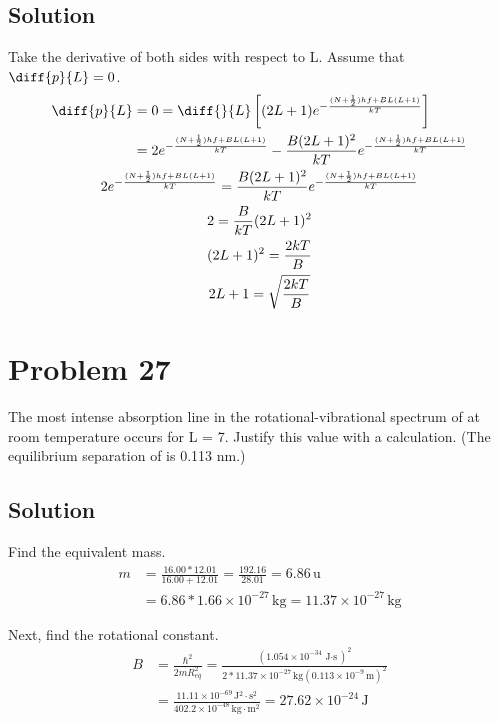 \documentclass[12pt]{report}
\newcommand{\e}[1]{e^{#1}}
\newcommand{\E}[1]{\times 10^{#1}}
\begin{document}
    \subsection{Solution}
        Take the derivative of both sides with respect to L.
        Assume that $\diff{p}{L} = 0$.
        \begin{gather}
            \begin{align}
                \diff{p}{L} &=  0
                    =   \diff{}{L}\left[ (2L + 1) \e{-\frac{(N + \frac{1}{2})hf + BL(L + 1)}{kT}}\right]\\
                    &=  2\e{-\frac{(N + \frac{1}{2})hf + BL(L + 1)}{kT}} - \frac{B(2L + 1)^2}{kT}\e{-\frac{(N + \frac{1}{2})hf + BL(L + 1)}{kT}}
            \end{align}\\
            2\e{-\frac{(N + \frac{1}{2})hf + BL(L + 1)}{kT}} = \frac{B(2L + 1)^2}{kT}\e{-\frac{(N + \frac{1}{2})hf + BL(L + 1)}{kT}}\\
            2 = \frac{B}{kT}(2L + 1)^2\\
            (2L+1)^2 = \frac{2kT}{B}\\
            2L + 1 = \sqrt{\frac{2kT}{B}}
        \end{gather}
    \pagebreak

\section{Problem 27}
    The most intense absorption line in the rotational-vibrational spectrum of  at room temperature occurs for L = 7. 
    Justify this value with a calculation. 
    (The equilibrium separation of  is 0.113 nm.)

    \subsection{Solution}
        Find the equivalent mass.
        \begin{align}
            m   &=  \frac{16.00 * 12.01}{16.00 + 12.01}
                =   \frac{192.16}{28.01}
                =   6.86\,\unit{\amu}\\
                &=  6.86 * 1.66\E{-27}\,\unit{\kilo\gram}
                =   11.37\E{-27}\,\unit{\kilo\gram}
        \end{align}

        Next, find the rotational constant.
        \begin{align}
            B   &=  \frac{\hbar^2}{2mR_{eq}^2}
                =   \frac{(1.054\E{-34}\,\unit{\joule\cdot\second})^2}{2 * 11.37\E{-27}\,\unit{\kilo\gram}(0.113\E{-9}\,\unit{\meter})^2}\\
                &=  \frac{11.11\E{-69}\,\unit{\joule^2\cdot\second^2}}{402.2\E{-48}\,\unit{\kilo\gram\cdot\meter^2}}
                =   27.62\E{-24}\,\unit{\joule}
        \end{align}
\end{document}
